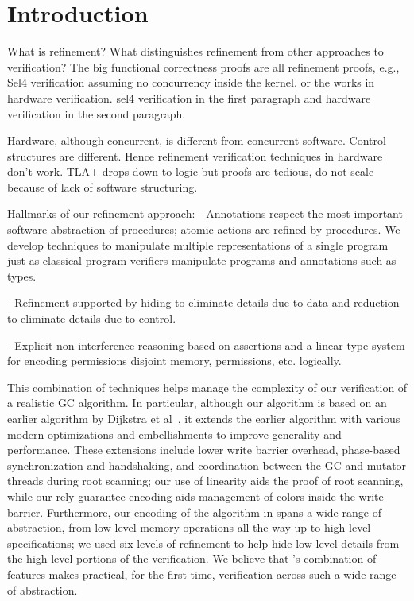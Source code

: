 \section{Introduction}
\label{sec:introduction}

What is refinement?  What distinguishes refinement from other approaches to verification? 
The big functional correctness proofs are all refinement proofs, e.g., Sel4 verification 
assuming no concurrency inside the kernel. or the works in hardware verification.  sel4 verification in the first paragraph and hardware verification in the second paragraph.

Hardware, although concurrent, is different from concurrent software.  
Control structures are different.  Hence refinement verification techniques in hardware don't work.
TLA+ drops down to logic but proofs are tedious, do not scale because of lack of software structuring.

Hallmarks of our refinement approach:
- Annotations respect the most important software abstraction of procedures; atomic actions are refined by procedures.
We develop techniques to manipulate multiple representations of a single program just as classical program verifiers manipulate programs and annotations such as types.


- Refinement supported by hiding to eliminate details due to data and reduction to eliminate details due to control.  

- Explicit non-interference reasoning based on assertions and a linear type system for encoding permissions disjoint memory, permissions, etc. logically.


This combination of techniques helps manage the complexity of our verification of a realistic GC algorithm.  
In particular, although our algorithm is based on an earlier algorithm by Dijkstra et al~\cite{dijk78}, 
it extends the earlier algorithm with various modern optimizations and embellishments to improve generality and performance.  
These extensions include lower write barrier overhead, phase-based synchronization and handshaking, 
and coordination between the GC and mutator threads during root scanning; our use of linearity aids the proof of root scanning, 
while our rely-guarantee encoding aids management of colors inside the write barrier.  
Furthermore, our encoding of the algorithm in \civl spans a wide range of abstraction, 
from low-level memory operations all the way up to high-level specifications; 
we used six levels of refinement to help hide low-level details from the high-level portions of the verification.
We believe that \civl's combination of features makes practical, for the first time, verification across such a wide range of abstraction.


